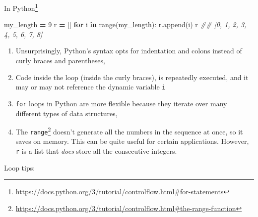 \documentclass[
  12pt,
]{krantz}
\makeatletter
\newenvironment{Shaded}{\begin{snugshade}}{\end{snugshade}}
\newcommand{\BuiltInTok}[1]{#1}
\newcommand{\CommentTok}[1]{\textcolor[rgb]{0.37,0.37,0.37}{\textit{#1}}}
\newcommand{\ControlFlowTok}[1]{\textcolor[rgb]{0.27,0.27,0.27}{\textbf{#1}}}
\newcommand{\DecValTok}[1]{\textcolor[rgb]{0.06,0.06,0.06}{#1}}
\newcommand{\KeywordTok}[1]{\textcolor[rgb]{0.27,0.27,0.27}{\textbf{#1}}}
\newcommand{\NormalTok}[1]{#1}
\newcommand{\OperatorTok}[1]{\textcolor[rgb]{0.43,0.43,0.43}{\textbf{#1}}}
\providecommand{\tightlist}{%
  \setlength{\itemsep}{0pt}\setlength{\parskip}{0pt}}
\renewcommand{\href}[2]{#2\footnote{\url{#1}}}
\newenvironment{kframe}{%
\medskip{}
\setlength{\fboxsep}{.8em}
 \def\at@end@of@kframe{}%
 \ifinner\ifhmode%
  \def\at@end@of@kframe{\end{minipage}}%
  \begin{minipage}{\columnwidth}%
 \fi\fi%
 \def\FrameCommand##1{\hskip\@totalleftmargin \hskip-\fboxsep
 \colorbox{shadecolor}{##1}\hskip-\fboxsep
     \hskip-\linewidth \hskip-\@totalleftmargin \hskip\columnwidth}%
 \MakeFramed {\advance\hsize-\width
   \@totalleftmargin\z@ \linewidth\hsize
   \@setminipage}}%
 {\par\unskip\endMakeFramed%
 \at@end@of@kframe}
\renewenvironment{Shaded}{\begin{kframe}}{\end{kframe}}
\makeatother
\begin{document}
\href{https://docs.python.org/3/tutorial/controlflow.html\#for-statements}{In Python}

\begin{Shaded}
\begin{Highlighting}[]
\NormalTok{my\_length }\OperatorTok{=} \DecValTok{9}
\NormalTok{r }\OperatorTok{=}\NormalTok{ []}
\ControlFlowTok{for}\NormalTok{ i }\KeywordTok{in} \BuiltInTok{range}\NormalTok{(my\_length):}
\NormalTok{    r.append(i)}
\NormalTok{r}
\CommentTok{\#\# [0, 1, 2, 3, 4, 5, 6, 7, 8]}
\end{Highlighting}
\end{Shaded}

\begin{enumerate}
\def\labelenumi{\arabic{enumi}.}
\tightlist
\item
  Unsurprisingly, Python's syntax opts for indentation and colons instead of curly braces and parentheses,
\item
  Code inside the loop (inside the curly braces), is repeatedly executed, and it may or may not reference the dynamic variable \texttt{i}
\item
  \texttt{for} loops in Python are more flexible because they iterate over many different types of data structures,
\item
  The \href{https://docs.python.org/3/tutorial/controlflow.html\#the-range-function}{\texttt{range}} doesn't generate all the numbers in the sequence at once, so it saves on memory. This can be quite useful for certain applications. However, \texttt{r} is a list that \emph{does} store all the consecutive integers.
\end{enumerate}

Loop tips:
\end{document}
